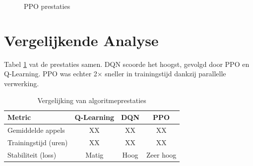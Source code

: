 \documentclass[a4paper,11pt]{report}
\begin{document}
\begin{figure}[h]
    \centering
    \hfill
    \caption{PPO prestaties}
    \label{fig:ppo}
\end{figure}

\section{Vergelijkende Analyse}
Tabel \ref{tab:comparison} vat de prestaties samen. DQN scoorde het hoogst,
gevolgd door PPO en Q-Learning. PPO was echter 2× sneller in trainingstijd
dankzij parallelle verwerking.

\begin{table}[h]
    \centering
    \caption{Vergelijking van algoritmeprestaties}
    \begin{tabular}{|l|c|c|c|}
        \hline
        Metric               & Q-Learning & DQN  & PPO       \\
        \hline
        Gemiddelde appels    & XX         & {XX} & {XX}      \\
        Trainingstijd (uren) & XX         & {XX} & {XX}      \\
        Stabiliteit (loss)   & Matig      & Hoog & Zeer hoog \\
        \hline
    \end{tabular}
    \label{tab:comparison}
\end{table}
\end{document}
